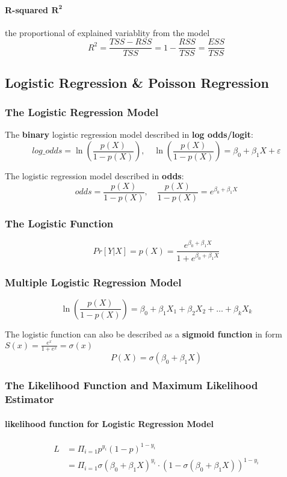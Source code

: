 \paragraph{R-squared $\mathbf{R^2}$} the proportional of explained variablity from the model
$$R^2 = \frac{TSS - RSS}{TSS} = 1 - \frac{RSS}{TSS} = \frac{ESS}{TSS}$$ 


\subsection{Logistic Regression \& Poisson Regression}
\subsubsection{The Logistic Regression Model}
The \textbf{binary} logistic regression model described in \textbf{log odds/logit}:
$$log\_odds  =  \ln(\frac{p(X)}{1 - p(X)}), \quad  \ln(\frac{p(X)}{1 - p(X)}) = \beta_0 + \beta_1 X + \varepsilon$$

The logistic regression model described in \textbf{odds}: 
$$odds = \frac{p(X)}{1 - p(X)}, \quad \frac{p(X)}{1 - p(X)} = e^{\beta_0 + \beta_1 X}$$

\subsubsection{The Logistic Function}
$$Pr[Y|X] = p(X) = \dfrac{e^{\beta_0 + \beta_1 X}}{1 + e^{\beta_0 + \beta_1 X}}$$

\subsubsection{Multiple Logistic Regression Model}
$$\ln(\frac{p(X)}{1 - p(X)}) = \beta_0 + \beta_1 X_1 + \beta_2 X_2 + \dots + \beta_k X_k$$

The logistic function can also be described as a \textbf{sigmoid function} in form $S(x) = \frac{e^x}{1 + e^x} = \sigma(x)$
$$P(X) = \sigma(\beta_0 + \beta_1 X)$$
\subsubsection{The Likelihood Function and Maximum Likelihood Estimator}
\paragraph{likelihood function for Logistic Regression Model}
\begin{align*}
	L &= \Pi_{i=1} p^{y_i}(1-p)^{1-y_i} \\
	&= \Pi_{i=1} \sigma(\beta_0 + \beta_1 X)^{y_i} \cdot (1 - \sigma(\beta_0 + \beta_1 X))^{1-y_i}
\end{align*}
